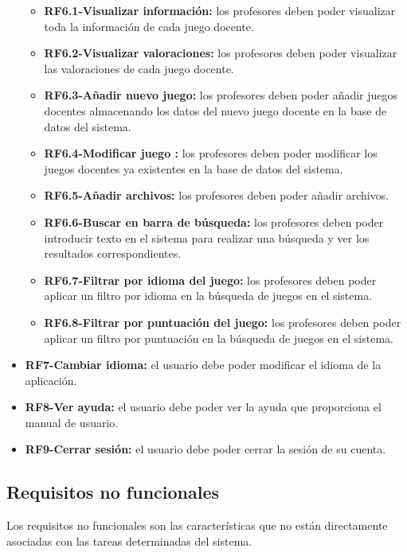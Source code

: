 \begin{itemize}
        \begin{itemize}
        \tightlist
            \item \textbf{RF6.1-Visualizar información:} los profesores deben poder visualizar toda la información de cada juego docente.
            \item \textbf{RF6.2-Visualizar valoraciones:} los profesores deben poder visualizar las valoraciones de cada juego docente.
            \item \textbf{RF6.3-Añadir nuevo juego:} los profesores deben poder añadir juegos docentes almacenando los datos del nuevo juego docente en la base de datos del sistema.
            \item \textbf{RF6.4-Modificar juego :} los profesores deben poder modificar los juegos docentes ya existentes en la base de datos del sistema.
            \item \textbf{RF6.5-Añadir archivos:} los profesores deben poder añadir archivos.
            \item \textbf{RF6.6-Buscar en barra de búsqueda:} los profesores deben poder introducir texto en el sistema para realizar una búsqueda y ver los resultados correspondientes.
            \item \textbf{RF6.7-Filtrar por idioma del juego:} los profesores deben poder aplicar un filtro por idioma en la búsqueda de juegos en el sistema.
            \item\textbf{RF6.8-Filtrar por puntuación del juego:} los profesores deben poder aplicar un filtro por puntuación en la búsqueda de juegos en el sistema.
        \end{itemize}
    \item \textbf{RF7-Cambiar idioma:} el usuario debe poder modificar el idioma de la aplicación.
    \item \textbf{RF8-Ver ayuda:} el usuario debe poder ver la ayuda que proporciona el manual de usuario.
    \item \textbf{RF9-Cerrar sesión:} el usuario debe poder cerrar la sesión de su cuenta.
\end{itemize}

\subsection{Requisitos no funcionales}
Los requisitos no funcionales son las características que no están directamente asociadas con las tareas determinadas del sistema.

